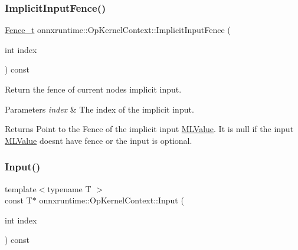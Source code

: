 \subsubsection{\texorpdfstring{Implicit\+Input\+Fence()}{ImplicitInputFence()}}
{\footnotesize\ttfamily \mbox{\hyperlink{namespaceonnxruntime_a71ef3c4da6339a3625cdf4c4937e4913}{Fence\+\_\+t}} onnxruntime\+::\+Op\+Kernel\+Context\+::\+Implicit\+Input\+Fence (\begin{DoxyParamCaption}\item[{int}]{index }\end{DoxyParamCaption}) const}

Return the fence of current node\textquotesingle{}s implicit input. 
\begin{DoxyParams}{Parameters}
{\em index} & The index of the implicit input. \\
\hline
\end{DoxyParams}
\begin{DoxyReturn}{Returns}
Point to the Fence of the implicit input \mbox{\hyperlink{classonnxruntime_1_1MLValue}{M\+L\+Value}}. It is null if the input \mbox{\hyperlink{classonnxruntime_1_1MLValue}{M\+L\+Value}} doesn\textquotesingle{}t have fence or the input is optional. 
\end{DoxyReturn}
\mbox{\label{classonnxruntime_1_1OpKernelContext_a55aa066dae670496d009d642c69407d0}} 
\subsubsection{\texorpdfstring{Input()}{Input()}}
{\footnotesize\ttfamily template$<$typename T $>$ \\
const T$\ast$ onnxruntime\+::\+Op\+Kernel\+Context\+::\+Input (\begin{DoxyParamCaption}\item[{int}]{index }\end{DoxyParamCaption}) const\hspace{0.3cm}{\ttfamily [inline]}}

\mbox{\label{classonnxruntime_1_1OpKernelContext_a155914a177b5e3bd08f6aa3d110bd7a3}} 
